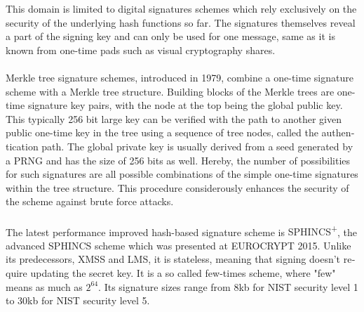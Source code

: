 \documentclass[a4paper,11pt]{article}
\begin{document}
\begin{otherlanguage}{english}
\begin{multicols}{2}
This domain is limited to digital signatures schemes which rely exclusively on the security of the underlying hash functions so far. The signatures themselves reveal a part of the signing key and can only be used for one message, same as it is known from one-time pads such as visual cryptography shares. \\
\\
Merkle tree signature schemes, introduced in 1979, combine a one-time signature scheme with a Merkle tree structure. Building blocks of the Merkle trees are one-time signature key pairs, with the node at the top being the global public key. This typically 256 bit large key can be verified with the path to another given public one-time key in the tree using a sequence of tree nodes, called the authentication path. The global private key is usually derived from a seed generated by a PRNG and has the size of 256 bits as well.
Hereby, the number of possibilities for such signatures are all possible combinations of the simple one-time signatures within the tree structure. This procedure considerously enhances the security of the scheme against brute force attacks. \\
\\
The latest performance improved hash-based signature scheme is \textsc{SPHINCS\textsuperscript{+}}\cite{SPH+}, the advanced \textsc{SPHINCS} \cite{SPH} scheme which was presented at EUROCRYPT 2015. Unlike its predecessors, XMSS and LMS, it is stateless, meaning that signing doesn't require updating the secret key. It is a so called few-times scheme, where "few" means as much as $2^{64}$. Its signature sizes range from 8kb for NIST security level 1 to 30kb for NIST security level 5.



\end{multicols}
\end{otherlanguage}
\end{document}
